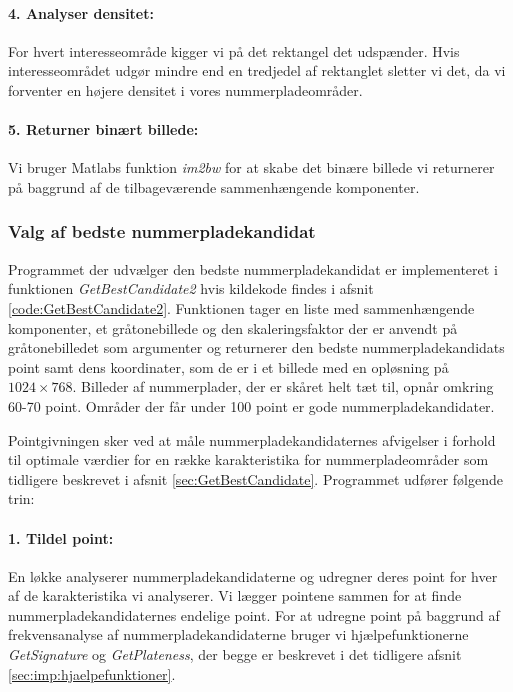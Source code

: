 \paragraph{4. Analyser densitet:}
For hvert interesseområde kigger vi på det rektangel det udspænder. Hvis interesseområdet udgør mindre end en tredjedel af rektanglet sletter vi det, da vi forventer en højere densitet i vores nummerpladeområder.

\paragraph{5. Returner binært billede:}
Vi bruger Matlabs funktion \textit{im2bw} for at skabe det binære billede vi returnerer på baggrund af de tilbageværende sammenhængende komponenter. 

\subsubsection{Valg af bedste nummerpladekandidat}
\label{sec:imp:GetBestCandidate}
Programmet der udvælger den bedste nummerpladekandidat er implementeret i funktionen \textit{GetBestCandidate2} hvis kildekode findes i afsnit \vref{code:GetBestCandidate2}. Funktionen tager en liste med sammenhængende komponenter, et gråtonebillede og den skaleringsfaktor der er anvendt på gråtonebilledet som argumenter og returnerer den bedste nummerpladekandidats point samt dens koordinater, som de er i et billede med en opløsning på $1024 \times 768$. Billeder af nummerplader, der er skåret helt tæt til, opnår omkring 60-70 point. Områder der får under 100 point er gode nummerpladekandidater. 

Pointgivningen sker ved at måle nummerpladekandidaternes afvigelser i forhold til optimale værdier for en række karakteristika for nummerpladeområder som tidligere beskrevet i afsnit \vref{sec:GetBestCandidate}.
Programmet udfører følgende trin:

\paragraph{1. Tildel point:}
En løkke analyserer nummerpladekandidaterne og udregner deres point for hver af de karakteristika vi analyserer. Vi lægger pointene sammen for at finde nummerpladekandidaternes endelige point. For at udregne point på baggrund af frekvensanalyse af nummerpladekandidaterne bruger vi hjælpefunktionerne \textit{GetSignature} og \textit{GetPlateness}, der begge er beskrevet i det tidligere afsnit \vref{sec:imp:hjaelpefunktioner}. 

